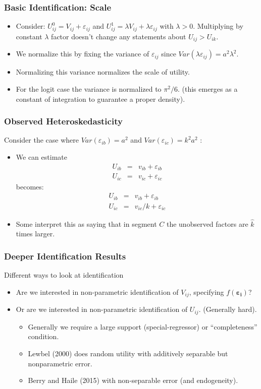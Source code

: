 \documentclass[aspectratio=169,11pt]{beamer}
\begin{document}
\begin{frame}
\frametitle{Basic Identification: Scale}
\begin{itemize}
\item Consider: $U_{ij}^0 = V_{ij} + \varepsilon_{ij}$ and  $U_{ij}^1 = \lambda V_{ij} + \lambda \varepsilon_{ij}$ with $\lambda > 0$. Multiplying by constant $\lambda$ factor doesn't change any statements about $U_{ij} > U_{ik}$.
\item We normalize this by fixing the variance of $\varepsilon_{ij}$ since $Var(\lambda \varepsilon_{ij} ) = a^2 \lambda^2$.
\item Normalizing this variance normalizes the scale of utility.
\item For the logit case the variance is normalized to $\pi^2/6$. (this emerges as a constant of integration to guarantee a proper density).
\end{itemize}
\end{frame}



\begin{frame}
\frametitle{Observed Heteroskedasticity}
Consider the case where $Var(\varepsilon_{ib}) = a^2$ and   $Var(\varepsilon_{ic}) =  k^2 a^2$ :
\begin{itemize}
\item We can estimate
\begin{eqnarray*}
U_{ib} &=& v_{ib}+ \varepsilon_{ib}\\
U_{ic} &=& v_{ic}+ \varepsilon_{ic}
\end{eqnarray*}
becomes:
\begin{eqnarray*}
U_{ib} &=& v_{ib}+ \varepsilon_{ib}\\
U_{ic} &=& v_{ic}/k+ \varepsilon_{ic}
\end{eqnarray*}
\item Some interpret this as saying that in segment $C$ the unobserved factors are $\hat{k}$ times larger.
\end{itemize}
\end{frame}

\begin{frame}
\frametitle{Deeper Identification Results}
Different ways to look at identification
\begin{itemize}
\item Are we interested in non-parametric identification of $V_{ij}$, specifying $f(\symbf{\varepsilon_i})$?
\item Or are we interested in non-parametric identification of $U_{ij}$. (Generally hard).
\begin{itemize}
\item Generally we require a large support (special-regressor) or ``completeness'' condition.
\item Lewbel (2000) does random utility with additively separable but nonparametric error.\item Berry and Haile (2015) with non-separable error (and endogeneity).
\end{itemize}
\end{itemize}
\end{frame}
\end{document}

